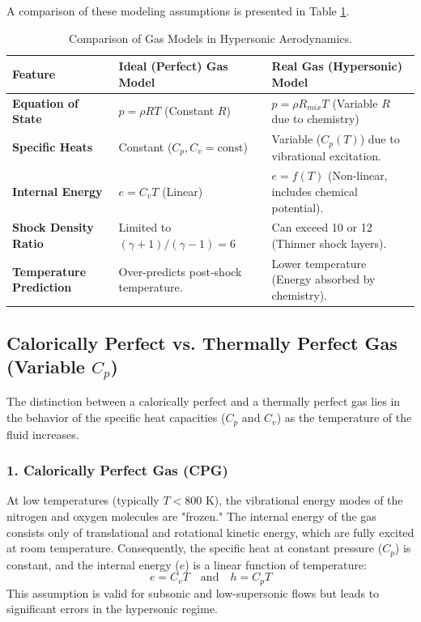 A comparison of these modeling assumptions is presented in Table \ref{tab:gas_models}.

\begin{table}[H]
    \centering
    \caption{Comparison of Gas Models in Hypersonic Aerodynamics.}
    \label{tab:gas_models}
    \begin{tabularx}{\textwidth}{|l|X|X|}
        \hline
        \rowcolor{gray!20} \textbf{Feature} & \textbf{Ideal (Perfect) Gas Model} & \textbf{Real Gas (Hypersonic) Model} \\ \hline
        \textbf{Equation of State} & $p = \rho R T$ (Constant $R$) & $p = \rho R_{mix} T$ (Variable $R$ due to chemistry) \\ \hline
        \textbf{Specific Heats} & Constant ($C_p, C_v = \text{const}$) & Variable ($C_p(T)$) due to vibrational excitation. \\ \hline
        \textbf{Internal Energy} & $e = C_v T$ (Linear) & $e = f(T)$ (Non-linear, includes chemical potential). \\ \hline
        \textbf{Shock Density Ratio} & Limited to $(\gamma+1)/(\gamma-1) = 6$ & Can exceed 10 or 12 (Thinner shock layers). \\ \hline
        \textbf{Temperature Prediction} & Over-predicts post-shock temperature. & Lower temperature (Energy absorbed by chemistry). \\ \hline
    \end{tabularx}
\end{table}

\subsection{Calorically Perfect vs. Thermally Perfect Gas (Variable \texorpdfstring{$C_p$}{C-p})}

\par
The distinction between a calorically perfect and a thermally perfect gas lies in the behavior of the specific heat capacities ($C_p$ and $C_v$) as the temperature of the fluid increases.



\subsubsection*{1. Calorically Perfect Gas (CPG)}
At low temperatures (typically $T < 800$ K), the vibrational energy modes of the nitrogen and oxygen molecules are "frozen." The internal energy of the gas consists only of translational and rotational kinetic energy, which are fully excited at room temperature. Consequently, the specific heat at constant pressure ($C_p$) is constant, and the internal energy ($e$) is a linear function of temperature:
\begin{equation}
    e = C_v T \quad \text{and} \quad h = C_p T
\end{equation}
This assumption is valid for subsonic and low-supersonic flows but leads to significant errors in the hypersonic regime.
\par
